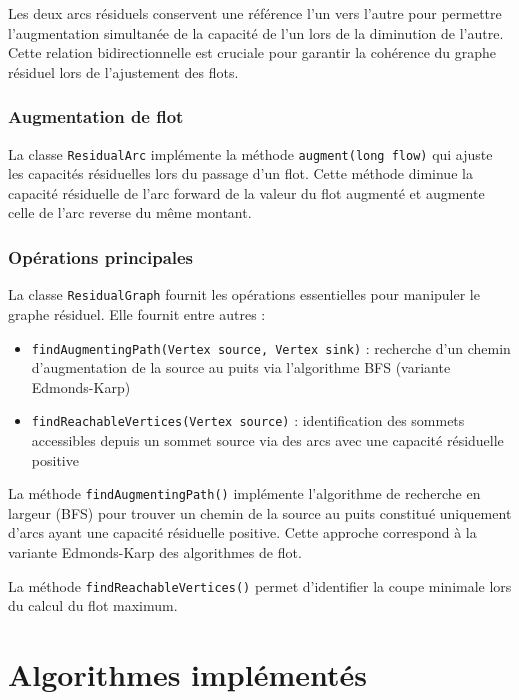 \documentclass[titlepage]{article}
\begin{document}
Les deux arcs résiduels conservent une référence l'un vers l'autre pour permettre l'augmentation simultanée de la capacité de l'un lors de la diminution de l'autre. Cette relation bidirectionnelle est cruciale pour garantir la cohérence du graphe résiduel lors de l'ajustement des flots.

\subsubsection{Augmentation de flot}

La classe \texttt{ResidualArc} implémente la méthode \texttt{augment(long flow)} qui ajuste les capacités résiduelles lors du passage d'un flot. Cette méthode diminue la capacité résiduelle de l'arc forward de la valeur du flot augmenté et augmente celle de l'arc reverse du même montant.

\subsubsection{Opérations principales}

La classe \texttt{ResidualGraph} fournit les opérations essentielles pour manipuler le graphe résiduel. Elle fournit entre autres :

\begin{itemize}
    \item \texttt{findAugmentingPath(Vertex source, Vertex sink)} : recherche d'un chemin d'augmentation de la source au puits via l'algorithme BFS (variante Edmonds-Karp)
    \item \texttt{findReachableVertices(Vertex source)} : identification des sommets accessibles depuis un sommet source via des arcs avec une capacité résiduelle positive

\end{itemize}

La méthode \texttt{findAugmentingPath()} implémente l'algorithme de recherche en largeur (BFS) pour trouver un chemin de la source au puits constitué uniquement d'arcs ayant une capacité résiduelle positive. Cette approche correspond à la variante Edmonds-Karp des algorithmes de flot. 

La méthode \texttt{findReachableVertices()} permet d'identifier la coupe minimale lors du calcul du flot maximum.


\clearpage



\section{Algorithmes implémentés}
\end{document}
